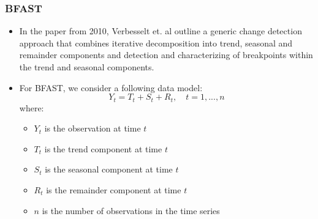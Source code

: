 \documentclass[presentation.tex]{subfiles}
\begin{document}

\begin{frame}
  \frametitle{BFAST}
  \begin{itemize}
    \item 
      In the paper from 2010, Verbesselt et. al outline a generic change detection approach
      that combines iterative decomposition into trend, seasonal and remainder components and detection
      and characterizing of breakpoints within the trend and seasonal components.
    \item 
      For BFAST, we consider a following data model:
      \[
      Y_t = T_t + S_t + R_t, \quad t = 1,...,n
      \]
      where:
      \begin{itemize}
      \item $Y_t$ is the observation at time $t$
      \item $T_t$ is the trend component at time $t$
      \item $S_t$ is the seasonal component at time $t$
      \item $R_t$ is the remainder component at time $t$
      \item $n$ is the number of observations in the time series
      \end{itemize}
  \end{itemize}
\end{frame}
\end{document}
